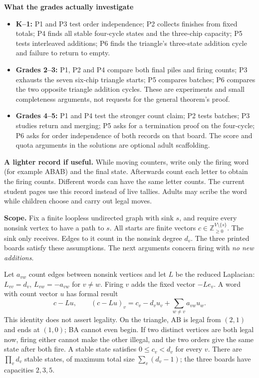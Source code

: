 \textbf{What the grades actually investigate}
\begin{itemize}
\item \textbf{K--1:} P1 and P3 test order independence; P2 collects finishes from fixed totals; P4 finds all stable four-cycle states and the three-chip capacity; P5 tests interleaved additions; P6 finds the triangle's three-state addition cycle and failure to return to empty.
\item \textbf{Grades 2--3:} P1, P2 and P4 compare both final piles and firing counts; P3 exhausts the seven six-chip triangle starts; P5 compares batches; P6 compares the two opposite triangle addition cycles. These are experiments and small completeness arguments, not requests for the general theorem's proof.
\item \textbf{Grades 4--5:} P1 and P4 test the stronger count claim; P2 tests batches; P3 studies return and merging; P5 asks for a termination proof on the four-cycle; P6 asks for order independence of both records on that board. The score and quota arguments in the solutions are optional adult scaffolding.
\end{itemize}

\textbf{A lighter record if useful.} While moving counters, write only the firing word (for example ABAB) and the final state. Afterwards count each letter to obtain the firing counts. Different words can have the same letter counts. The current student pages use this record instead of live tallies. Adults may scribe the word while children choose and carry out legal moves.

\newpage
{}\label{theorem}
\textbf{Scope.} Fix a finite loopless undirected graph with sink $s$, and require every nonsink vertex to have a path to $s$. All starts are finite vectors $c\in\mathbb Z_{\ge0}^{V\setminus\{s\}}$. The sink only receives. Edges to it count in the nonsink degree $d_v$. The three printed boards satisfy these assumptions. The next arguments concern firing with \emph{no new additions}.

Let $a_{vw}$ count edges between nonsink vertices and let $L$ be the reduced Laplacian: $L_{vv}=d_v$, $L_{vw}=-a_{vw}$ for $v\ne w$. Firing $v$ adds the fixed vector $-Le_v$. A word with count vector $u$ has formal result
\[
c-Lu,\qquad (c-Lu)_v=c_v-d_vu_v+\sum_{w\ne v}a_{vw}u_w.
\]
This identity does not assert legality. On the triangle, AB is legal from $(2,1)$ and ends at $(1,0)$; BA cannot even begin. If two distinct vertices are both legal now, firing either cannot make the other illegal, and the two orders give the same state after both fire. A stable state satisfies $0\le c_v<d_v$ for every $v$. There are $\prod_vd_v$ stable states, of maximum total size $\sum_v(d_v-1)$; the three boards have capacities $2,3,5$.

